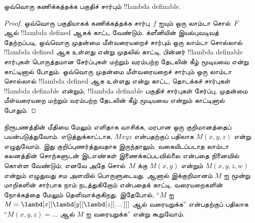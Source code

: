\documentclass[../../../include/open-logic-section]{subfiles}
\begin{document}

\begin{thm}
ஒவ்வொரு கணிக்கத்தக்க பகுதிச் சார்பும் !!{lambda definable}.
\end{thm}

\begin{proof}
ஒவ்வொரு பகுதியாகக் கணிக்கத்தக்க சார்பு~$f$ ஐயும் ஒரு லாம்டா சொல்~$F$
ஆல் !!{lambda defined} ஆகக் காட்ட வேண்டும். க்ளீனியின் இயல்புவடிவத் தேற்றப்படி,
ஒவ்வொரு முதன்மை மீள்வரையறைச் சார்பும் ஒரு லாம்டா சொல்லால் !!{lambda defined}
ஆக உள்ளது என்று முதலில் காட்டி, பின்னர் !!{lambda definable} சார்புகள் பொருத்தமான
சேர்ப்புகள் மற்றும் வரம்பற்ற தேடலின் கீழ் மூடியவை என்று காட்டினால் போதும்.
ஒவ்வொரு முதன்மை மீள்வரையறைச் சார்பும் ஒரு லாம்டா சொல்லால் !!{lambda defined}
ஆக உள்ளது என்று காட்ட, தொடக்கச் சார்புகள் !!{lambda definable} என்றும்,
!!{lambda definable} பகுதிச் சார்புகள் சேர்ப்பு, முதன்மை மீள்வரையறை மற்றும்
வரம்பற்ற தேடலின் கீழ் மூடியவை என்றும் காட்டினால் போதும்.
\end{proof}

நிரூபணத்தின் மீதியை மேலும் எளிதாக வாசிக்க, மரபான ஒரு குறிமானத்தைப்
பயன்படுத்துவோம். எடுத்துக்காட்டாக, $Mxyz$ என்பதற்குப் பதிலாக $M(x, y, z)$
என்று எழுதுவோம். இது குறிப்புணர்த்துவதாக இருந்தாலும், வகையிடப்படாத லாம்டா
கலனத்தின் சொற்களுடன் இடஎண்கள் இணைக்கப்படவில்லை என்பதை நினைவில் கொள்ள வேண்டும்;
எனவே அதே சொல்~$M$ க்கு $M(x,y)$ என்றும் $M(x,y,z,w)$ என்றும் எழுதுவது
சம அளவில் பொருளுடையது. ஆனால் இக்குறிமானம் $M$ ஐ மூன்று மாறிகளின் சார்பாக
நாம் நடத்துகிறோம் என்பதைக் காட்டி, வரையறைகளின் நோக்கத்தை மேலும் தெளிவாக்குகிறது.
இதேபோல், ``$M$ ஐ $M = \lambd[x][\lambd[y][\lambd[z][\dots]]]$ ஆல்
வரையறுக்க'' என்பதற்குப் பதிலாக ``$M(x,y,z) = \dots$ ஆல் $M$ ஐ வரையறுக்க''
என்று கூறுவோம்.
\end{document}
